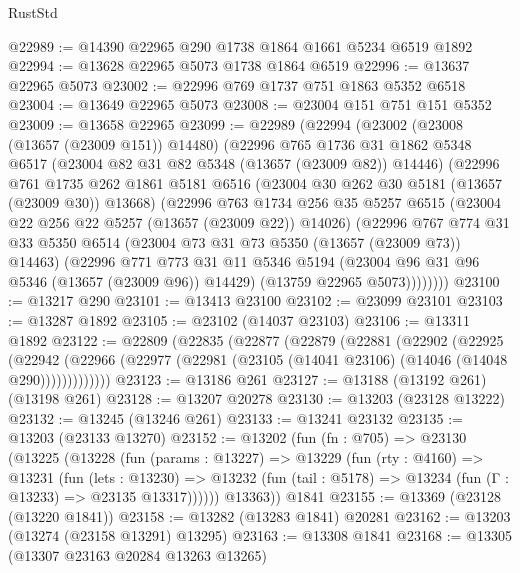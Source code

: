 \begin{lexlean}{RustStd}
\begin{coremodule}
@22989 := @14390 @22965 @290 @1738 @1864 @1661 @5234 @6519 @1892
@22994 := @13628 @22965 @5073 @1738 @1864 @6519
@22996 := @13637 @22965 @5073
@23002 := @22996 @769 @1737 @751 @1863 @5352 @6518
@23004 := @13649 @22965 @5073
@23008 := @23004 @151 @751 @151 @5352
@23009 := @13658 @22965
@23099 := @22989
    (@22994
      (@23002
        (@23008 (@13657 (@23009 @151)) @14480)
        (@22996
          @765
          @1736
          @31
          @1862
          @5348
          @6517
          (@23004 @82 @31 @82 @5348 (@13657 (@23009 @82)) @14446)
          (@22996
            @761
            @1735
            @262
            @1861
            @5181
            @6516
            (@23004 @30 @262 @30 @5181 (@13657 (@23009 @30)) @13668)
            (@22996
              @763
              @1734
              @256
              @35
              @5257
              @6515
              (@23004 @22 @256 @22 @5257 (@13657 (@23009 @22)) @14026)
              (@22996
                @767
                @774
                @31
                @33
                @5350
                @6514
                (@23004 @73 @31 @73 @5350 (@13657 (@23009 @73)) @14463)
                (@22996
                  @771
                  @773
                  @31
                  @11
                  @5346
                  @5194
                  (@23004 @96 @31 @96 @5346 (@13657 (@23009 @96)) @14429)
                  (@13759 @22965 @5073))))))))
@23100 := @13217 @290
@23101 := @13413 @23100
@23102 := @23099 @23101
@23103 := @13287 @1892
@23105 := @23102 (@14037 @23103)
@23106 := @13311 @1892
@23122 := @22809
    (@22835
      (@22877
        (@22879
          (@22881
            (@22902
              (@22925
                (@22942
                  (@22966 (@22977 (@22981 (@23105 (@14041 @23106) (@14046 (@14048 @290)))))))))))))
@23123 := @13186 @261
@23127 := @13188 (@13192 @261) (@13198 @261)
@23128 := @13207 @20278
@23130 := @13203 (@23128 @13222)
@23132 := @13245 (@13246 @261)
@23133 := @13241 @23132
@23135 := @13203 (@23133 @13270)
@23152 := @13202
    (fun (fn : @705) =>
    @23130
      (@13225
        (@13228
          (fun (params : @13227) =>
          @13229
            (fun (rty : @4160) =>
            @13231
              (fun (lets : @13230) =>
              @13232 (fun (tail : @5178) => @13234 (fun (Γ : @13233) => @23135 @13317))))))
        @13363))
    @1841
@23155 := @13369 (@23128 (@13220 @1841))
@23158 := @13282 (@13283 @1841) @20281
@23162 := @13203 (@13274 (@23158 @13291) @13295)
@23163 := @13308 @1841
@23168 := @13305 (@13307 @23163 @20284 @13263 @13265)

\end{coremodule}
\end{lexlean}
